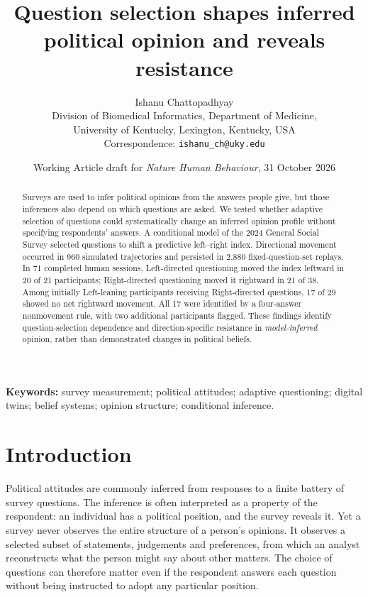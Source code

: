 \documentclass[11pt]{article}
\title{\bfseries Question selection shapes inferred political opinion and reveals resistance}
\author{Ishanu Chattopadhyay\\
\small Division of Biomedical Informatics, Department of Medicine,\\
\small University of Kentucky, Lexington, Kentucky, USA\\
\small Correspondence: \texttt{ishanu\_ch@uky.edu}}
\date{Working Article draft for \textit{Nature Human Behaviour}, 31 October 2026}
\begin{document}
\maketitle
{}

\begin{abstract}
Surveys are used to infer political opinions from the answers people give, but those inferences also depend on which questions are asked. We tested whether adaptive selection of questions could systematically change an inferred opinion profile without specifying respondents' answers. A conditional model of the 2024 General Social Survey selected questions to shift a predictive left--right index. Directional movement occurred in 960 simulated trajectories and persisted in 2,880 fixed-question-set replays. In 71 completed human sessions, Left-directed questioning moved the index leftward in 20 of 21 participants; Right-directed questioning moved it rightward in 21 of 38. Among initially Left-leaning participants receiving Right-directed questions, 17 of 29 showed no net rightward movement. All 17 were identified by a four-answer nonmovement rule, with two additional participants flagged. These findings identify question-selection dependence and direction-specific resistance in \emph{model-inferred} opinion, rather than demonstrated changes in political beliefs.
\end{abstract}

\noindent\textbf{Keywords:} survey measurement; political attitudes; adaptive questioning; digital twins; belief systems; opinion structure; conditional inference.

\section*{Introduction}
Political attitudes are commonly inferred from responses to a finite battery of survey questions. The inference is often interpreted as a property of the respondent: an individual has a political position, and the survey reveals it. Yet a survey never observes the entire structure of a person's opinions. It observes a selected subset of statements, judgements and preferences, from which an analyst reconstructs what the person might say about other matters. The choice of questions can therefore matter even if the respondent answers each question without being instructed to adopt any particular position.
\end{document}
